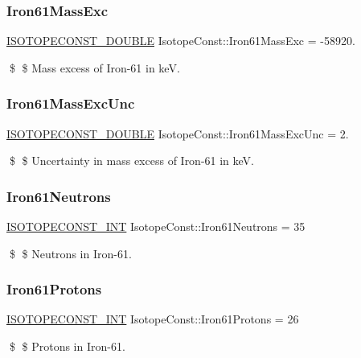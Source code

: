 \subsubsection{\texorpdfstring{Iron61\+Mass\+Exc}{Iron61MassExc}}
{\footnotesize\ttfamily \mbox{\hyperlink{group___isotope_const-_macros_ga8f45a7272ce02c0b4c65c44636ed719a}{I\+S\+O\+T\+O\+P\+E\+C\+O\+N\+S\+T\+\_\+\+D\+O\+U\+B\+LE}} Isotope\+Const\+::\+Iron61\+Mass\+Exc = -\/58920.}

\$ \$ Mass excess of Iron-\/61 in keV. \mbox{\label{group___isotope_const-_iron-_fe61_ga1a427a6fb233fadc457410ee9f6e6e17}} 
\subsubsection{\texorpdfstring{Iron61\+Mass\+Exc\+Unc}{Iron61MassExcUnc}}
{\footnotesize\ttfamily \mbox{\hyperlink{group___isotope_const-_macros_ga8f45a7272ce02c0b4c65c44636ed719a}{I\+S\+O\+T\+O\+P\+E\+C\+O\+N\+S\+T\+\_\+\+D\+O\+U\+B\+LE}} Isotope\+Const\+::\+Iron61\+Mass\+Exc\+Unc = 2.}

\$ \$ Uncertainty in mass excess of Iron-\/61 in keV. \mbox{\label{group___isotope_const-_iron-_fe61_ga3f12b99650ae787868314b7c54fc4fd2}} 
\subsubsection{\texorpdfstring{Iron61\+Neutrons}{Iron61Neutrons}}
{\footnotesize\ttfamily \mbox{\hyperlink{group___isotope_const-_macros_ga5f18360b3e99483a35c32d789e62621c}{I\+S\+O\+T\+O\+P\+E\+C\+O\+N\+S\+T\+\_\+\+I\+NT}} Isotope\+Const\+::\+Iron61\+Neutrons = 35}

\$ \$ Neutrons in Iron-\/61. \mbox{\label{group___isotope_const-_iron-_fe61_ga86ff86dd79704c33699a4ae6b777ba71}} 
\subsubsection{\texorpdfstring{Iron61\+Protons}{Iron61Protons}}
{\footnotesize\ttfamily \mbox{\hyperlink{group___isotope_const-_macros_ga5f18360b3e99483a35c32d789e62621c}{I\+S\+O\+T\+O\+P\+E\+C\+O\+N\+S\+T\+\_\+\+I\+NT}} Isotope\+Const\+::\+Iron61\+Protons = 26}

\$ \$ Protons in Iron-\/61. 